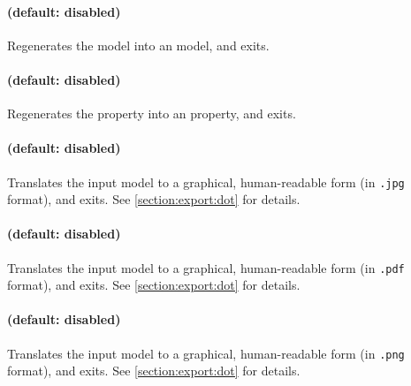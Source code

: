 \paragraph{ (default: disabled)}
Regenerates the model into an \imitator{} model, and exits.

\paragraph{ (default: disabled)}
Regenerates the property into an \imitator{} property, and exits.

\paragraph{ (default: disabled)}
Translates the input model to a graphical, human-readable form (in \texttt{.jpg} format), and exits.
See \cref{section:export:dot} for details.

\paragraph{ (default: disabled)}
Translates the input model to a graphical, human-readable form (in \texttt{.pdf} format), and exits.
See \cref{section:export:dot} for details.

\paragraph{ (default: disabled)}
Translates the input model to a graphical, human-readable form (in \texttt{.png} format), and exits.
See \cref{section:export:dot} for details.

